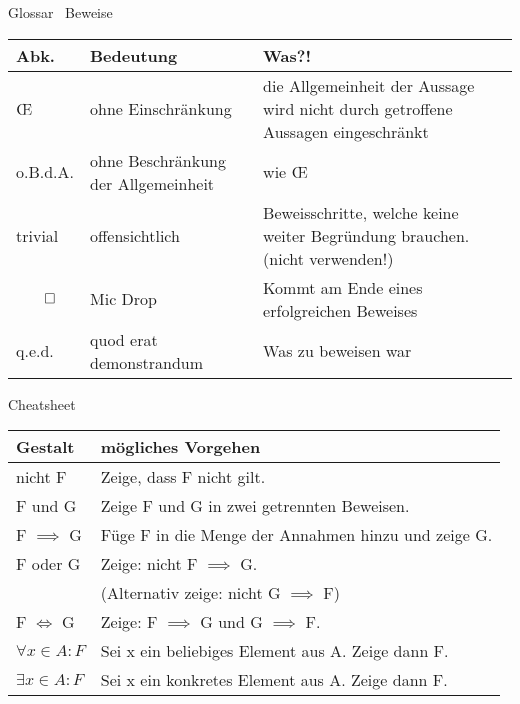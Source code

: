 \begin{frame}[fragile]{Glossar \textemdash\ Beweise}
	\small
	\begin{tabular}{p{} p{} p{}}
		\toprule
		Abk.     & Bedeutung                           & Was?!                                                                            \\
		\midrule
		\OE      & ohne Einschränkung                  & die Allgemeinheit der Aussage wird nicht durch getroffene Aussagen eingeschränkt \\
		o.B.d.A. & ohne Beschränkung der Allgemeinheit & wie \OE                                                                          \\
		trivial  & offensichtlich                      & Beweisschritte, welche keine weiter Begründung brauchen. (nicht verwenden!)      \\
		$\qed$   & Mic Drop                            & Kommt am Ende eines erfolgreichen Beweises                                       \\
		q.e.d.   & quod erat demonstrandum             & Was zu beweisen war                                                              \\
		\bottomrule
	\end{tabular}
\end{frame}

\begin{frame}[fragile]{Cheatsheet}
	\small
	\begin{tabular}{p{} p{}}
		\toprule
		Gestalt               & mögliches Vorgehen                                  \\
		\midrule
		nicht F               & Zeige, dass F nicht gilt.                           \\
		F und G               & Zeige F und G in zwei getrennten Beweisen.          \\
		F $\implies$ G        & Füge F in die Menge der Annahmen hinzu und zeige G. \\
		F oder G              & Zeige: nicht F $\implies$ G.                        \\&(Alternativ zeige: nicht G $\implies$ F)\\
		F $\iff$ G            & Zeige: F $\implies$ G und G $\implies$ F.           \\
		$\forall x \in A : F$ & Sei x ein beliebiges Element aus A. Zeige dann F.   \\
		$\exists x \in A : F$ & Sei x ein konkretes Element aus A. Zeige dann F.    \\
		\bottomrule
	\end{tabular}
\end{frame}